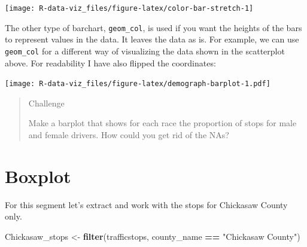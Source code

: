 \documentclass[]{book}
\newenvironment{Shaded}{\begin{snugshade}}{\end{snugshade}}
\newcommand{\KeywordTok}[1]{\textcolor[rgb]{0.13,0.29,0.53}{\textbf{#1}}}
\newcommand{\DataTypeTok}[1]{\textcolor[rgb]{0.13,0.29,0.53}{#1}}
\newcommand{\FloatTok}[1]{\textcolor[rgb]{0.00,0.00,0.81}{#1}}
\newcommand{\StringTok}[1]{\textcolor[rgb]{0.31,0.60,0.02}{#1}}
\newcommand{\OperatorTok}[1]{\textcolor[rgb]{0.81,0.36,0.00}{\textbf{#1}}}
\newcommand{\NormalTok}[1]{#1}
\theoremstyle{definition}
\theoremstyle{definition}
\theoremstyle{definition}
\theoremstyle{remark}
\begin{document}
\texttt{[image: R-data-viz\_files/figure-latex/color-bar-stretch-1]}

The other type of barchart, \texttt{geom\_col}, is used if you want the
heights of the bars to represent values in the data. It leaves the data
as is. For example, we can use \texttt{geom\_col} for a different way of
visualizing the data shown in the scatterplot above. For readability I
have also flipped the coordinates:

\begin{Shaded}
\end{Shaded}

\texttt{[image: R-data-viz\_files/figure-latex/demograph-barplot-1.pdf]}

\begin{quote}
Challenge

Make a barplot that shows for each race the proportion of stops for male
and female drivers. How could you get rid of the NAs?
\end{quote}

\section{Boxplot}\label{boxplot}

For this segment let's extract and work with the stops for Chickasaw
County only.

\begin{Shaded}
\begin{Highlighting}[]
\NormalTok{Chickasaw_stops <-}\StringTok{ }\KeywordTok{filter}\NormalTok{(trafficstops, county_name }\OperatorTok{==}\StringTok{ "Chickasaw County"}\NormalTok{)}
\end{Highlighting}
\end{Shaded}
\end{document}
